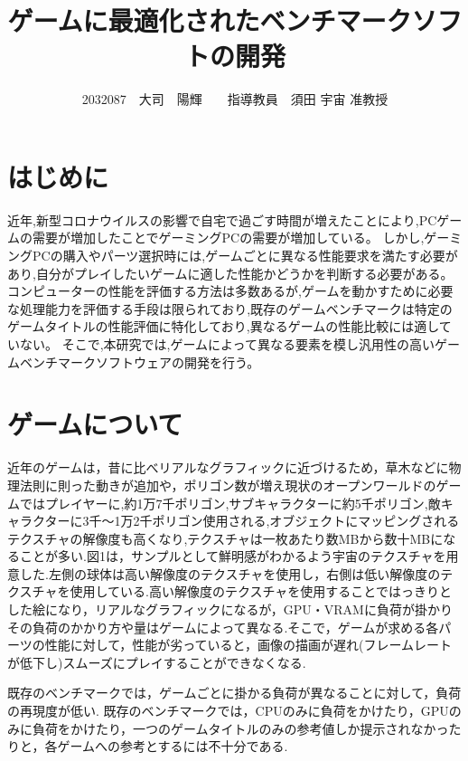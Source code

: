 \documentclass[twocolumn,10pt,a4j]{ltjsarticle}
\title{ゲームに最適化されたベンチマークソフトの開発}
\author{2032087　大司　陽輝　　指導教員　須田 宇宙 准教授}
\date{}
\begin{document}
\maketitle

\section{はじめに}
近年,新型コロナウイルスの影響で自宅で過ごす時間が増えたことにより,PCゲームの需要が増加したことでゲーミングPCの需要が増加している。
しかし,ゲーミングPCの購入やパーツ選択時には,ゲームごとに異なる性能要求を満たす必要があり,自分がプレイしたいゲームに適した性能かどうかを判断する必要がある。コンピューターの性能を評価する方法は多数あるが,ゲームを動かすために必要な処理能力を評価する手段は限られており,既存のゲームベンチマークは特定のゲームタイトルの性能評価に特化しており,異なるゲームの性能比較には適していない。
そこで,本研究では,ゲームによって異なる要素を模し汎用性の高いゲームベンチマークソフトウェアの開発を行う。

\section{ゲームについて}
近年のゲームは，昔に比べリアルなグラフィックに近づけるため，草木などに物理法則に則った動きが追加や，ポリゴン数が増え現状のオープンワールドのゲームではプレイヤーに,約1万7千ポリゴン,サブキャラクターに約5千ポリゴン,敵キャラクターに3千～1万2千ポリゴン使用される,オブジェクトにマッピングされるテクスチャの解像度も高くなり,テクスチャは一枚あたり数MBから数十MBになることが多い.図1は，サンプルとして鮮明感がわかるよう宇宙のテクスチャを用意した.左側の球体は高い解像度のテクスチャを使用し，右側は低い解像度のテクスチャを使用している.高い解像度のテクスチャを使用することではっきりとした絵になり，リアルなグラフィックになるが，GPU・VRAMに負荷が掛かりその負荷のかかり方や量はゲームによって異なる.そこで，ゲームが求める各パーツの性能に対して，性能が劣っていると，画像の描画が遅れ(フレームレートが低下し)スムーズにプレイすることができなくなる.%

既存のベンチマークでは，ゲームごとに掛かる負荷が異なることに対して，負荷の再現度が低い.
既存のベンチマークでは，CPUのみに負荷をかけたり，GPUのみに負荷をかけたり，一つのゲームタイトルのみの参考値しか提示されなかったりと，各ゲームへの参考とするには不十分である.
\end{document}
